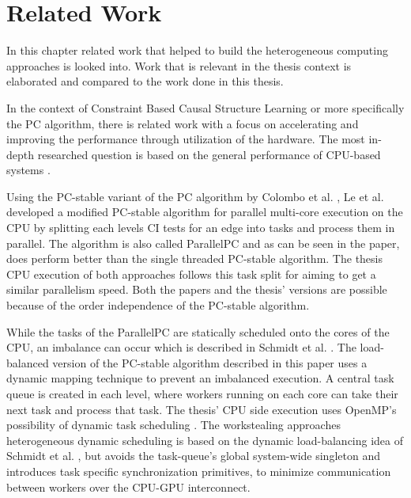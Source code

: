 \chapter{Related Work}
In this chapter related work that helped to build the heterogeneous computing approaches is looked into. Work that is relevant in the thesis context is elaborated and compared to the work done in this thesis.

In the context of Constraint Based Causal Structure Learning or more specifically the PC algorithm, there is related work with a focus on accelerating and improving the performance through utilization of the hardware. The most in-depth researched question is based on the general performance of CPU-based systems \cite{leFastPCAlgorithm2019, leParallelPCPackageEfficient2018, schmidtLoadBalancedParallelConstraintBased2019, colomboOrderIndependentConstraintBasedCausal,kalischEstimatingHighDimensionalDirected2007,scutariBayesianNetworkConstraintBased2017, madsenParallelAlgorithmBayesian2017,madsenParallelisationPCAlgorithm2015,nguyenMrPCCausalStructure2020}. 

Using the PC-stable variant of the PC algorithm by Colombo et al. \cite{colomboOrderIndependentConstraintBasedCausal}, Le et al. \cite{leFastPCAlgorithm2019, leParallelPCPackageEfficient2018} developed a modified PC-stable algorithm for parallel multi-core execution on the CPU by splitting each levels CI tests for an edge into tasks and process them in parallel. The algorithm is also called ParallelPC and as can be seen in the paper, does perform better than the single threaded PC-stable algorithm. The thesis CPU execution of both approaches follows this task split for aiming to get a similar parallelism speed. Both the papers and the thesis' versions are possible because of the order independence of the PC-stable algorithm.

While the tasks of the ParallelPC are statically scheduled onto the cores of the CPU, an imbalance can occur which is described in Schmidt et al. \cite{schmidtLoadBalancedParallelConstraintBased2019}. The load-balanced version of the PC-stable algorithm described in this paper uses a dynamic mapping technique to prevent an imbalanced execution. A central task queue is created in each level, where workers running on each core can take their next task and process that task. The thesis' CPU side execution uses OpenMP's possibility of dynamic task scheduling \cite{breshearsArtConcurrencyThread2009}. The workstealing approaches heterogeneous dynamic scheduling is based on the dynamic load-balancing idea of Schmidt et al. \cite{schmidtLoadBalancedParallelConstraintBased2019}, but avoids the task-queue's global system-wide singleton and introduces task specific synchronization primitives, to minimize communication between workers over the CPU-GPU interconnect.

